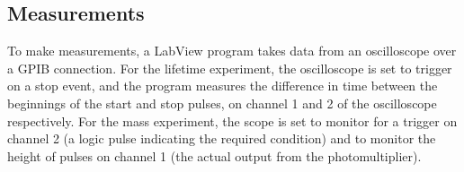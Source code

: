 \subsection{Measurements}
\label{Measurements}
To make measurements, a LabView program takes data from an oscilloscope over a GPIB connection. For the lifetime experiment, the oscilloscope is set to trigger on a stop event, and the program measures the difference in time between the beginnings of the start and stop pulses, on channel 1 and 2 of the oscilloscope respectively. For the mass experiment, the scope is set to monitor for a trigger on channel 2 (a logic pulse indicating the required condition) and to monitor the height of pulses on channel 1 (the actual output from the photomultiplier).